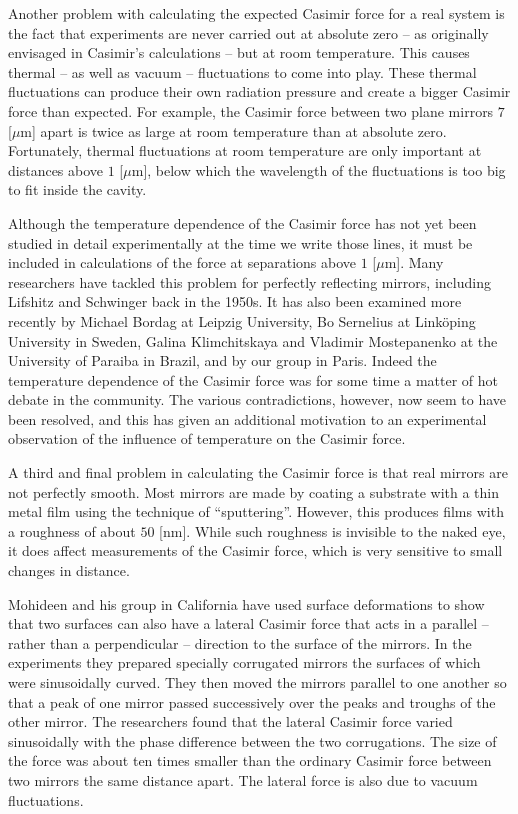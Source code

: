 	Another problem with calculating the expected Casimir force for a real system is the fact that experiments are never carried out at absolute zero – as originally envisaged in Casimir’s calculations – but at room temperature. This causes thermal – as well as vacuum – fluctuations to come into play. These thermal fluctuations can produce their own radiation pressure and create a bigger Casimir force than expected. For example, the Casimir force between two plane mirrors $7$ [$\mu$m] apart is twice as large at room temperature than at absolute zero. Fortunately, thermal fluctuations at room temperature are only important at distances above $1$ [$\mu$m], below which the wavelength of the fluctuations is too big to fit inside the cavity.
	
	Although the temperature dependence of the Casimir force has not yet been studied in detail experimentally at the time we write those lines, it must be included in calculations of the force at separations above $1$ [$\mu$m]. Many researchers have tackled this problem for perfectly reflecting mirrors, including Lifshitz and Schwinger back in the 1950s. It has also been examined more recently by Michael Bordag at Leipzig University, Bo Sernelius at Linköping University in Sweden, Galina Klimchitskaya and Vladimir Mostepanenko at the University of Paraiba in Brazil, and by our group in Paris. Indeed the temperature dependence of the Casimir force was for some time a matter of hot debate in the community. The various contradictions, however, now seem to have been resolved, and this has given an additional motivation to an experimental observation of the influence of temperature on the Casimir force.

	A third and final problem in calculating the Casimir force is that real mirrors are not perfectly smooth. Most mirrors are made by coating a substrate with a thin metal film using the technique of “sputtering”. However, this produces films with a roughness of about $50$ [nm]. While such roughness is invisible to the naked eye, it does affect measurements of the Casimir force, which is very sensitive to small changes in distance.

	Mohideen and his group in California have used surface deformations to show that two surfaces can also have a lateral Casimir force that acts in a parallel – rather than a perpendicular – direction to the surface of the mirrors. In the experiments they prepared specially corrugated mirrors the surfaces of which were sinusoidally curved. They then moved the mirrors parallel to one another so that a peak of one mirror passed successively over the peaks and troughs of the other mirror. The researchers found that the lateral Casimir force varied sinusoidally with the phase difference between the two corrugations. The size of the force was about ten times smaller than the ordinary Casimir force between two mirrors the same distance apart. The lateral force is also due to vacuum fluctuations.
	

